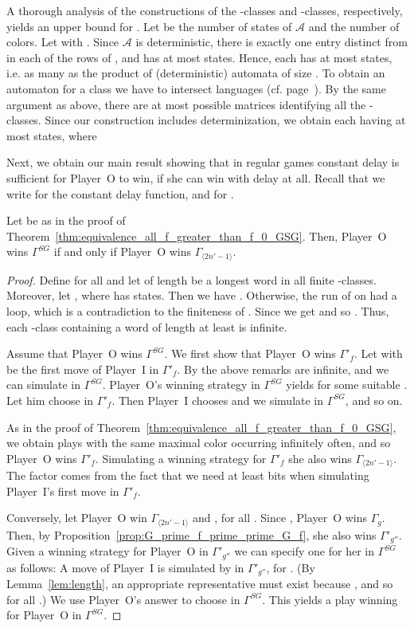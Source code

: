 \documentclass[fleqn,envcountsame]{LMCS}
\newcommand{\aut}[1]{\ensuremath{\mathcal{#1}}}
\newcommand{\pI}{Player~I\xspace}
\newcommand{\pO}{Player~O\xspace}
\newcommand{\GSG}{\ensuremath{\Gamma^{SG}}\xspace}
\newcommand{\Gd}[1]{\ensuremath{\Gamma_{#1}}\xspace}
\newcommand{\Gp}[1]{\ensuremath{\Gamma'_{#1}}\xspace}
\newcommand{\const}[1]{\ensuremath{\langle#1\rangle}\xspace}
\newcommand{\ie}{i.e.\xspace}
\newcommand{\cf}{cf.\xspace}
\begin{document}
A thorough analysis of the constructions of the -classes and
-classes, respectively, yields an upper bound for . Let
 be the number of states of \aut{A} and  the number of
colors. Let  with . Since \aut{A} is deterministic,
there is exactly one entry distinct from  in each of the 
rows of , and  has at most 
states. Hence, each  has at most 
states, \ie as many as the product of  (deterministic) automata
of size . To obtain an automaton for a class  we have to intersect
 languages (\cf page~\pageref{pageref:definition_L_A_u}).
By the same argument as above, there are at most  possible
matrices identifying all the -classes. Since our construction
includes determinization, we obtain each  having
at most  states, where

Next, we obtain our main result showing that in regular games constant delay
is sufficient for \pO to win, if she can win with delay at all.
Recall that we write  for the constant delay function,
 and  for .

\begin{lem}\label{lem:bound}
Let  be as in the proof of Theorem~\ref{thm:equivalence_all_f_greater_than_f_0_GSG}.
Then, \pO wins \GSG if and only if \pO wins \Gd{\const{2n'-1}}.
\end{lem}

\begin{proof}
Define  for all  and let  of length  be a longest word in all
finite -classes. Moreover, let , where  has  states.
Then we have . Otherwise, the run of  on  had a loop,
which is a contradiction to the finiteness of .
Since  we get  and so .
Thus, each -class containing a word of length at least  is infinite.

Assume that \pO wins \GSG. We first show that \pO wins \Gp{f}.
Let  with  be the first move of \pI in
\Gp{f}. By the above remarks  are infinite, and we can
simulate  in \GSG. \pO's winning strategy in \GSG yields
 for some suitable . Let him choose
 in \Gp{f}. Then \pI chooses  and we simulate  in
\GSG, and so on.

As in the proof of Theorem~\ref{thm:equivalence_all_f_greater_than_f_0_GSG},
we obtain plays with the same maximal color occurring infinitely often, and so
\pO wins \Gp{f}. Simulating a winning strategy for \Gp{f} she also wins
\Gd{\const{2n'-1}}. The factor  comes from the fact that we need at least
 bits when simulating \pI's first move in \Gp{f}.

Conversely, let \pO win \Gd{\const{2n'-1}} and , for all
. Since , \pO wins \Gd{g}.
Then, by Proposition~\ref{prop:G_prime_f_prime_prime_G_f},
she also wins \Gp{g''}. Given a winning strategy for \pO in \Gp{g''}
we can specify one for her in \GSG as follows: A move  of \pI is
simulated by  in \Gp{g''}, for .
(By Lemma~\ref{lem:length}, an appropriate representative  must exist
because , and so  for all
.) We use \pO's answer  to choose
 in \GSG.
This yields a play winning for \pO in \GSG.
\end{proof}
\end{document}
